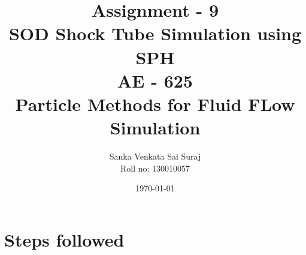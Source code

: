 \documentclass[12pt, a4paper]{report}
\title{\huge Assignment - 9 \\
		\huge SOD Shock Tube Simulation using SPH \\
		\large AE - 625 \\
		\large Particle Methods for Fluid FLow Simulation 		
		}
\author{\large Sanka Venkata Sai Suraj \\
		\large Roll no: 130010057
		}
\date{\today}
\begin{document}
\maketitle

\section*{Steps followed}
\end{document}
